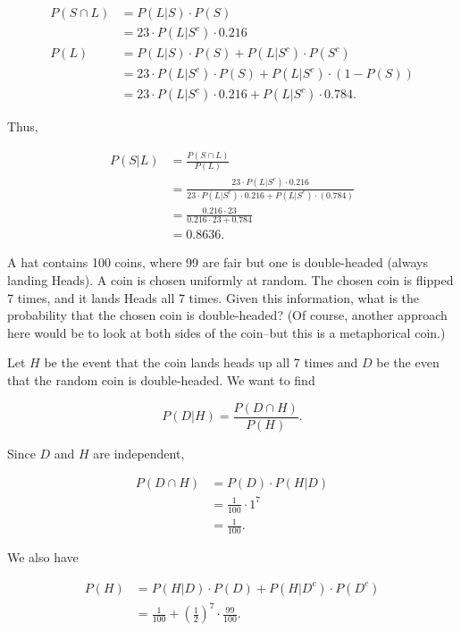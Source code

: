 \documentclass[answers]{exam}
\begin{document}
\begin{questions}
\begin{solution}
\begin{align*}
P(S \cap L) &= P(L|S) \cdot P(S) \\ 
&= 23 \cdot P(L|S^{c}) \cdot 0.216 \\ 
P(L) &= P(L|S) \cdot P(S) + P(L|S^{c}) \cdot P(S^{c}) \\ 
&= 23 \cdot P(L|S^{c}) \cdot P(S) + P(L|S^{c}) \cdot (1 - P(S)) \\ 
&= 23 \cdot P(L|S^{c}) \cdot 0.216 + P(L|S^{c}) \cdot 0.784. 
\end{align*}

Thus, 

\begin{align*}
P(S|L) &= \frac{P(S \cap L)}{P(L)} \\ 
&= \frac{23 \cdot P(L|S^{c}) \cdot 0.216}{23 \cdot P(L|S^{c}) \cdot 0.216 + P(L|S^{c}) \cdot (0.784)} \\
&= \frac{0.216 \cdot 23}{0.216 \cdot 23 + 0.784} \\
&= 0.8636
.\end{align*}
\end{solution}

\question[10]
A hat contains 100 coins, where 99 are fair but one is double-headed (always
landing Heads). A coin is chosen uniformly at random. The chosen coin is flipped
7 times, and it lands Heads all 7 times. Given this information, what is the
probability that the chosen coin is double-headed? (Of course, another approach
here would be to look at both sides of the coin--but this is a metaphorical
coin.)

\begin{solution}
Let $H$ be the event that the coin lands heads up all 7 times and $D$ be the
even that the random coin is double-headed. We want to find

\[
P(D|H) = \frac{P(D \cap H)}{P(H)}
.\] 

Since $D$ and $H$ are independent, 

\begin{align*}
P(D \cap H) &= P(D) \cdot P(H|D) \\ 
&= \frac{1}{100} \cdot 1^{7} \\ 
&= \frac{1}{100}
.\end{align*}

We also have

\begin{align*}
P(H) &= P(H|D) \cdot P(D) + P(H|D^{c}) \cdot P(D^{c}) \\ 
&= \frac{1}{100} + \left( \frac{1}{2} \right)^{7} \cdot \frac{99}{100}
.\end{align*}


\end{solution}
\end{questions}
\end{document}
